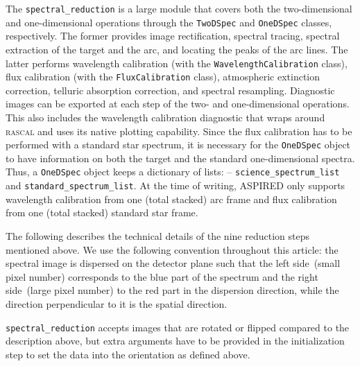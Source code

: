 \documentclass[linenumbers, twocolumn]{aastex631}
\begin{document}
The \texttt{spectral\_reduction} is a large module that covers both the
two-dimensional and one-dimensional operations through the \texttt{TwoDSpec} and
\texttt{OneDSpec} classes, respectively. The former provides image
rectification, spectral tracing, spectral extraction of the target and the
arc, and locating the peaks of the arc lines. The latter performs
wavelength calibration (with the \texttt{WavelengthCalibration} class),
flux calibration (with the \texttt{FluxCalibration} class), atmospheric
extinction correction, telluric absorption correction, and
spectral resampling. Diagnostic images can be exported at each step of the
two- and one-dimensional operations. This also includes the wavelength
calibration diagnostic that wraps around \textsc{rascal} and uses its native
plotting capability. Since the flux calibration has to be performed
with a standard star spectrum, it is necessary for the \texttt{OneDSpec}
object to have information on both the target and the standard one-dimensional
spectra. Thus, a \texttt{OneDSpec} object keeps a dictionary of lists: --
\texttt{science\_spectrum\_list} and \texttt{standard\_spectrum\_list}. At the
time of writing, \textsc{ASPIRED} only supports wavelength calibration from one (total
stacked) arc frame and flux calibration from one (total stacked) standard star frame.

The following describes the technical details of the nine reduction steps mentioned above.
We use the following convention throughout this article: the spectral image is
dispersed on the detector plane such that the left side~(small pixel number)
corresponds to the blue part of the spectrum and the right side~(large pixel
number) to the red part in the dispersion direction, while the direction
perpendicular to it is the spatial direction.

\texttt{spectral\_reduction} accepts images that are rotated or flipped
compared to the description above, but extra arguments have to be provided
in the initialization step to set the data into the orientation as defined
above.

\end{document}
